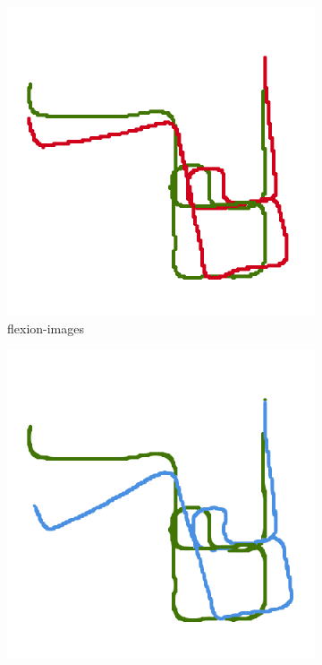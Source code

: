 \begin{figure}[htp]
\begin{subfigure}[t]{0.31\linewidth}
    \includegraphics[width=\linewidth]{chapter06/odo/jonas_flexion_AKAZE_nice.png}%
    \caption{\glspl{flexion-image}}
\end{subfigure}%
\begin{subfigure}[t]{0.31\linewidth}
    \includegraphics[width=\linewidth]{chapter06/odo/jonas_bearing_AKAZE_nice.png}%

\end{subfigure}
\end{figure}
